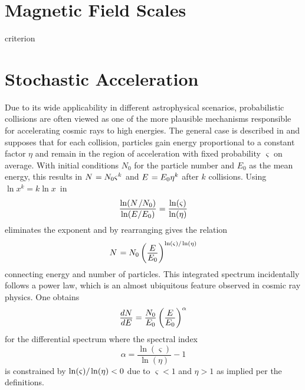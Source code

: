  \cite{Gaisser_2016}



\section{Magnetic Field Scales}
\label{sec:fields}

\cite{Hillas_1984} criterion



\section{Stochastic Acceleration}
\label{sec:stochastic}

Due to its wide applicability in different astrophysical scenarios, probabilistic collisions are often viewed as one of
the more plausible mechanisms responsible for accelerating cosmic rays to high energies. The general case is described in
\cite{Longair_2011} and supposes that for each collision, particles gain energy proportional to a constant factor $\eta$ and
remain in the region of acceleration with fixed probability $\varsigma$ on average. With initial conditions $N_0$ for the
particle number and $E_0$ as the mean energy, this results in $N \kern+0.9pt = N_0 \varsigma^k$ and $E \kern+0.9pt = E_0 \eta^k$
after $k$ collisions. Using $\ln x^k = k\ln x$~in
\begin{equation*}
	\frac{\ln (N \kern+1.0pt / N_0)}{\ln (E / E_0)} = \frac{\ln(\varsigma)}{\ln(\eta)}
\end{equation*}
eliminates the exponent and by rearranging gives the relation
\begin{equation*}
	N \kern+0.9pt = N_0 \left( \frac{\raisebox{-0.3ex}{$E$}}{\raisebox{0.3ex}{$E_0$}} \right)^{\ln(\varsigma) / \kern-0.5pt \ln(\eta)}
\end{equation*}
connecting energy and number of particles. This integrated spectrum incidentally follows a power law, which is an almost
ubiquitous feature observed in cosmic ray physics. One obtains
\begin{equation*}
	\frac{\raisebox{-0.3ex}{$dN$}}{\raisebox{0.3ex}{$dE$}} = \frac{\raisebox{-0.3ex}{$N_0$}}{\raisebox{0.3ex}{$E_0$}}
	\left( \frac{\raisebox{-0.3ex}{$E$}}{\raisebox{0.3ex}{$E_0$}} \right)^\alpha
\end{equation*}
for the differential spectrum where the spectral index
\begin{equation*}
	\alpha = \frac{\ln(\varsigma)}{\ln(\eta)} - 1
\end{equation*}
is constrained by $\ln(\varsigma) / \kern-0.5pt \ln(\eta) < 0$ due to $\varsigma < 1$ and $\eta > 1$ as implied per the definitions.

